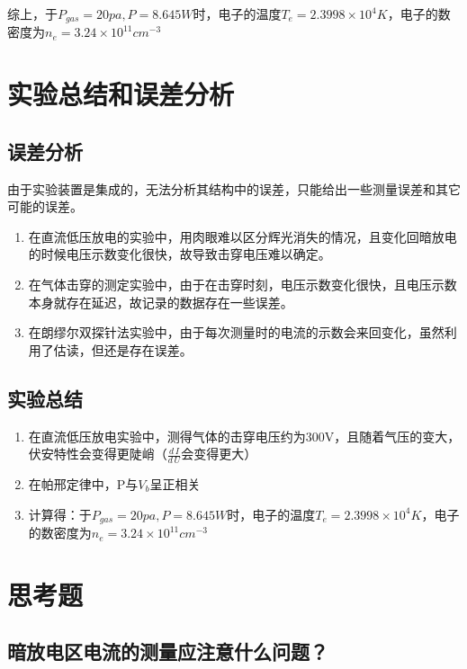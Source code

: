 \documentclass[a4paper,UTF8]{ctexart}
\begin{document}
综上，于$P_{gas}=20pa,P=8.645W$时，电子的温度$T_e = 2.3998 \times 10^4 K$，电子的数密度为$n_e = 3.24\times 10^{11} cm^{-3}$

\section{实验总结和误差分析}

\subsection{误差分析}

由于实验装置是集成的，无法分析其结构中的误差，只能给出一些测量误差和其它可能的误差。

\begin{enumerate}
    \item 在直流低压放电的实验中，用肉眼难以区分辉光消失的情况，且变化回暗放电的时候电压示数变化很快，故导致击穿电压难以确定。
    \item 在气体击穿的测定实验中，由于在击穿时刻，电压示数变化很快，且电压示数本身就存在延迟，故记录的数据存在一些误差。
    \item 在朗缪尔双探针法实验中，由于每次测量时的电流的示数会来回变化，虽然利用了估读，但还是存在误差。
\end{enumerate}

\subsection{实验总结}

\begin{enumerate}
    \item 在直流低压放电实验中，测得气体的击穿电压约为300V，且随着气压的变大，伏安特性会变得更陡峭（$\frac{d\,I}{d\,U}$会变得更大）
    \item 在帕邢定律中，P与$V_b$呈正相关
    \item 计算得：于$P_{gas}=20pa,P=8.645W$时，电子的温度$T_e = 2.3998 \times 10^4 K$，电子的数密度为$n_e = 3.24\times 10^{11} cm^{-3}$
\end{enumerate}

\section{思考题}

\subsection{暗放电区电流的测量应注意什么问题？}
\end{document}
